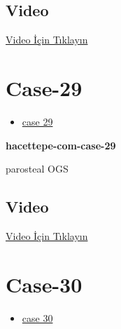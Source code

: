 \documentclass[
  letterpaper,
  DIV=11,
  numbers=noendperiod]{scrreprt}
\providecommand{\tightlist}{%
  \setlength{\itemsep}{0pt}\setlength{\parskip}{0pt}}\usepackage{longtable,booktabs,array}
\begin{document}
\hypertarget{video-26}{%
\subsection{Video}\label{video-26}}

\href{https://www.youtube.com/watch?v=yUrabUzw3RI}{Video İçin Tıklayın}

\hypertarget{sec-hacettepe-case-of-the-month-case-29}{%
\section{Case-29}\label{sec-hacettepe-case-of-the-month-case-29}}

\begin{itemize}
\tightlist
\item
  \href{https://www.youtube.com/watch?v=GkGz7NV7JmM\&ab_channel=KemalKosemehmetoglu}{case
  29}
\end{itemize}

\textbf{hacettepe-com-case-29}

\begin{tcolorbox}[enhanced jigsaw, colbacktitle=quarto-callout-tip-color!10!white, colback=white, titlerule=0mm, opacityback=0, colframe=quarto-callout-tip-color-frame, opacitybacktitle=0.6, bottomrule=.15mm, breakable, coltitle=black, title=\textcolor{quarto-callout-tip-color}{\faLightbulb}\hspace{0.5em}{Tanı}, toprule=.15mm, toptitle=1mm, bottomtitle=1mm, arc=.35mm, rightrule=.15mm, leftrule=.75mm, left=2mm]

parosteal OGS

\end{tcolorbox}

\hypertarget{video-27}{%
\subsection{Video}\label{video-27}}

\href{https://www.youtube.com/watch?v=GkGz7NV7JmM}{Video İçin Tıklayın}

\hypertarget{sec-hacettepe-case-of-the-month-case-30}{%
\section{Case-30}\label{sec-hacettepe-case-of-the-month-case-30}}

\begin{itemize}
\tightlist
\item
  \href{https://www.youtube.com/watch?v=az6Fk7bYsQ8\&ab_channel=KemalKosemehmetoglu}{case
  30}
\end{itemize}
\end{document}
